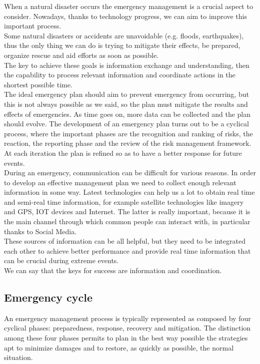 \noindent When a natural disaster occurs the emergency management is a crucial aspect to consider. Nowadays, thanks to technology progress, we can aim to improve this important process.
\\
\noindent Some natural disasters or accidents are unavoidable (e.g. floods, earthquakes), thus the only thing we can do is trying to mitigate their effects, be prepared, organize rescue and aid efforts as soon as possible. 
\\
\noindent The key to achieve these goals is information exchange and understanding, then the capability to process relevant information and coordinate actions in the shortest possible time.
\\
\noindent The ideal emergency plan should aim to prevent emergency from occurring, but this is not always possible as we said, so the plan must mitigate the results and effects of emergencies. As time goes on, more data can be collected and the plan should evolve. The development of an emergency plan turns out to be a cyclical process, where the important phases are the recognition and ranking of risks, the reaction, the reporting phase and the review of the risk management framework. At each iteration the plan is refined so as to have a better response for future events.
\\
\noindent During an emergency, communication can be difficult for various reasons. In order to develop an effective management plan we need to collect enough relevant information in some way. Latest technologies can help us a lot to obtain real time and semi-real time information, for example satellite technologies like imagery and GPS, IOT devices and Internet. The latter is really important, because it is the main channel through which common people can interact with, in particular thanks to Social Media.
\\
\noindent These sources of information can be all helpful, but they need to be integrated each other to achieve better performance and provide real time information that can be crucial during extreme events.
\\
\noindent We can say that the keys for success are information and coordination.

\subsection{Emergency cycle}
An emergency management process is typically represented as composed by four cyclical phases: preparedness, response, recovery and mitigation. The distinction among these four phases permits to plan in the best way possible the strategies apt to minimize damages and to restore, as quickly as possible, the normal situation.


